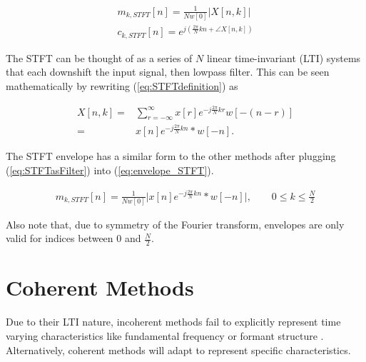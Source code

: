 \documentclass [11pt, proquest,oneside] {ganter_thesis}[2015/03/03]
\begin{document}
\begin{align}
\label{eq:envelope_STFT}
m_{k,STFT}[n] =  \frac{1}{Nw[0]}  \vert X[n,k]\vert \\
c_{k,STFT}[n] = e^{j(\frac{2\pi}{N}kn + \angle X[n,k])}
\end{align}

The STFT can be thought of as a series of $N$ linear time-invariant (LTI) systems that each downshift the input signal, then lowpass filter.  This can be seen mathematically by rewriting (\ref{eq:STFTdefinition}) as

\begin{align}
X[n,k] =& \sum\limits_{r=-\infty}^{\infty} x[r] e^{-j\frac{2\pi}{N}kr} w[-(n - r)] \nonumber \\
\label{eq:STFTasFilter}
=& x[n] e^{-j\frac{2\pi}{N}kn} * w[-n].
\end{align}

The STFT envelope has a similar form to the other methods after plugging (\ref{eq:STFTasFilter}) into (\ref{eq:envelope_STFT}).

\begin{align}
\label{eq:STFT_envelope}
m_{k,STFT}[n] =  \frac{1}{Nw[0]}  \Big\vert x[n] e^{-j\frac{2\pi}{N}kn} * w[-n] \Big\vert, \qquad 0 \leq k \leq \frac{N}{2}
\end{align}

Also note that, due to symmetry of the Fourier transform, envelopes are only valid for indices between $0$ and $\frac{N}{2}$.

\section{Coherent Methods}

Due to their LTI nature, incoherent methods fail to explicitly represent time varying characteristics like fundamental frequency or formant structure \cite{wilson1993design}.  Alternatively, coherent methods will adapt to represent specific characteristics.


\end{document}
